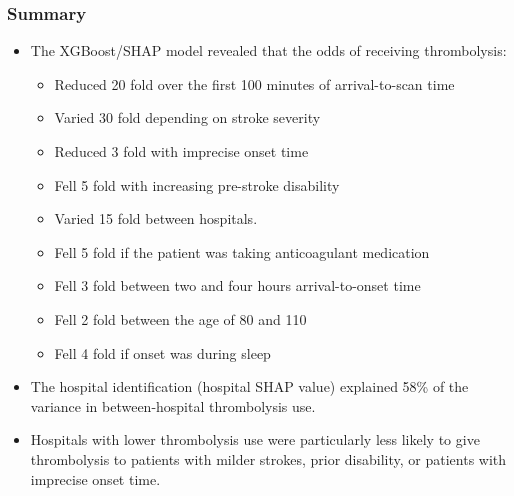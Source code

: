 
\begin{frame}
\frametitle{Summary}
\small

\begin{itemize}
    \item The XGBoost/SHAP model revealed that the odds of receiving thrombolysis:
    
    \begin{itemize}
        \scriptsize
        \item Reduced 20 fold over the first 100 minutes of arrival-to-scan time
        \item Varied 30 fold depending on stroke severity
        \item Reduced 3 fold with imprecise onset time
        \item Fell 5 fold with increasing pre-stroke disability
        \item Varied 15 fold between hospitals.
        \item Fell 5 fold if the patient was taking anticoagulant medication
        \item Fell 3 fold between two and four hours arrival-to-onset time
        \item Fell 2 fold between the age of 80 and 110
        \item Fell 4 fold if onset was during sleep
    \end{itemize}

\small
\item The hospital identification (hospital SHAP value) explained 58\% of the variance in between-hospital thrombolysis use. 

\item Hospitals with lower thrombolysis use were particularly less likely to give thrombolysis to patients with milder strokes, prior disability, or patients with imprecise onset time.
\end{itemize}

\end{frame}
